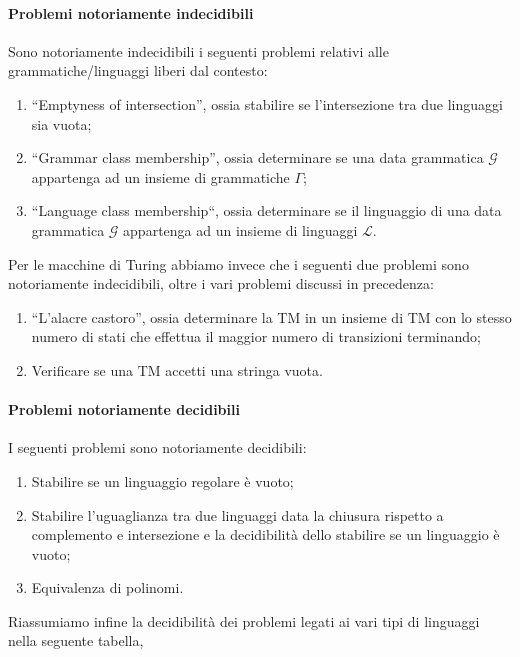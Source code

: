 \documentclass[a4paper,11pt,twoside]{article}
\theoremstyle{plain}
\theoremstyle{definition}
\theoremstyle{remark}
\begin{document}
\paragraph{Problemi notoriamente indecidibili} Sono notoriamente indecidibili i
seguenti problemi relativi alle grammatiche/linguaggi liberi dal contesto:

\begin{enumerate}
  \item ``Emptyness of intersection'', ossia stabilire se l'intersezione tra due
    linguaggi sia vuota;
  \item ``Grammar class membership'', ossia determinare se una data grammatica
    $\mathcal{G}$ appartenga ad un insieme di grammatiche $\Gamma$;
  \item ``Language class membership``, ossia determinare se il linguaggio di
    una data grammatica $\mathcal{G}$ appartenga ad un insieme di linguaggi
    $\mathcal{L}$.
\end{enumerate}

\noindent Per le macchine di Turing abbiamo invece che i seguenti due problemi
sono notoriamente indecidibili, oltre i vari problemi discussi in precedenza:

\begin{enumerate}
  \item ``L'alacre castoro'', ossia determinare la TM in un insieme di TM con lo
    stesso numero di stati che effettua il maggior numero di transizioni
    terminando;
  \item Verificare se una TM accetti una stringa vuota.
\end{enumerate}

\paragraph{Problemi notoriamente decidibili} I seguenti problemi sono
notoriamente decidibili:

\begin{enumerate}
  \item Stabilire se un linguaggio regolare è vuoto;
  \item Stabilire l'uguaglianza tra due linguaggi data la chiusura rispetto a
    complemento e intersezione e la decidibilità dello stabilire se un
    linguaggio è vuoto;
  \item Equivalenza di polinomi.
\end{enumerate}

Riassumiamo infine la decidibilità dei problemi legati ai vari tipi di
linguaggi nella seguente tabella,
\end{document}

